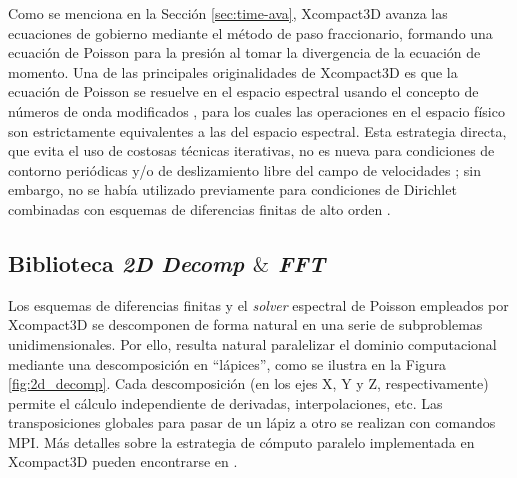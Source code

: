 
Como se menciona en la Sección \ref{sec:time-ava}, Xcompact3D avanza las ecuaciones de gobierno mediante el método de paso fraccionario, formando una ecuación de Poisson para la presión al tomar la divergencia de la ecuación de momento. Una de las principales originalidades de Xcompact3D es que la ecuación de Poisson se resuelve en el espacio espectral usando el concepto de números de onda modificados \cite{lele1992compact}, para los cuales las operaciones en el espacio físico son estrictamente equivalentes a las del espacio espectral. Esta estrategia directa, que evita el uso de costosas técnicas iterativas, no es nueva para condiciones de contorno periódicas y/o de deslizamiento libre del campo de velocidades \cite{schumann1976direct}; sin embargo, no se había utilizado previamente para condiciones de Dirichlet combinadas con esquemas de diferencias finitas de alto orden \cite{laizet2009high}.

\subsection{Biblioteca \textit{2D Decomp $\&$ FFT}}

Los esquemas de diferencias finitas y el \textit{solver} espectral de Poisson empleados por Xcompact3D se descomponen de forma natural en una serie de subproblemas unidimensionales. Por ello, resulta natural paralelizar el dominio computacional mediante una descomposición en “lápices”, como se ilustra en la Figura \ref{fig:2d_decomp}. Cada descomposición (en los ejes X, Y y Z, respectivamente) permite el cálculo independiente de derivadas, interpolaciones, etc. Las transposiciones globales para pasar de un lápiz a otro se realizan con comandos MPI. Más detalles sobre la estrategia de cómputo paralelo implementada en Xcompact3D pueden encontrarse en \cite{laizet2011incompact3d}.



